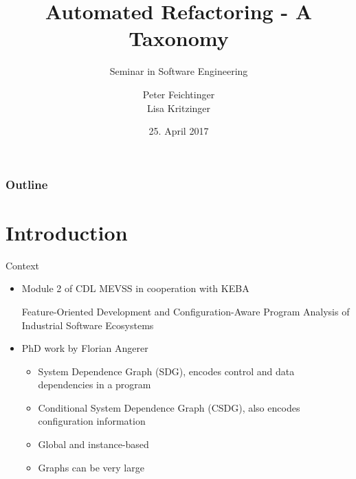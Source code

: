 \documentclass{beamer}
\title[Refactoring]{Automated Refactoring - A Taxonomy}
\subtitle{Seminar in Software Engineering}
\institute[]{Institute for Software Systems Engineering\\Johannes Kepler University Linz}
\author[Feichtinger, Kritzinger]{Peter Feichtinger\texorpdfstring{\\}{, }Lisa Kritzinger} %
\date{25. April 2017}
\begin{document}
\begin{frame}
  \titlepage
\end{frame}

\begin{frame}
  \frametitle{Outline} 
  \tableofcontents          %
\end{frame}


\section{Introduction}  %

\begin{frame}{Context}
  \begin{itemize}
    \item Module 2 of CDL MEVSS in cooperation with KEBA
      
      Feature-Oriented Development and Configuration-Aware Program Analysis of Industrial Software Ecosystems
    \pause
    \item PhD work by Florian Angerer
    \begin{itemize}
      \item System Dependence Graph (SDG), encodes control and data dependencies in a program
      \pause
      \item Conditional System Dependence Graph (CSDG), also encodes configuration information
      \pause
      \item Global and instance-based
      \item Graphs can be very large
    \end{itemize}
  \end{itemize}
\end{frame}

%  
%
\end{document}
